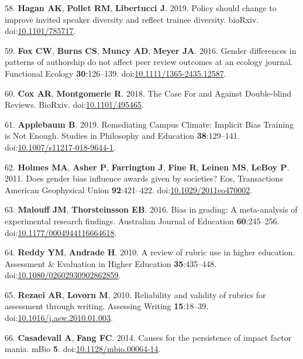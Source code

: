 \documentclass[11pt,]{article}
\begin{document}
\hypertarget{ref-Hagan_2019}{}
58. \textbf{Hagan AK}, \textbf{Pollet RM}, \textbf{Libertucci J}. 2019.
Policy should change to improve invited speaker diversity and reflect
trainee diversity. bioRxiv.
doi:\href{https://doi.org/10.1101/785717}{10.1101/785717}.

\hypertarget{ref-fox_gender_2016}{}
59. \textbf{Fox CW}, \textbf{Burns CS}, \textbf{Muncy AD}, \textbf{Meyer
JA}. 2016. Gender differences in patterns of authorship do not affect
peer review outcomes at an ecology journal. Functional Ecology
\textbf{30}:126--139.
doi:\href{https://doi.org/10.1111/1365-2435.12587}{10.1111/1365-2435.12587}.

\hypertarget{ref-cox_case_2018}{}
60. \textbf{Cox AR}, \textbf{Montgomerie R}. 2018. The Case For and
Against Double-blind Reviews. BioRxiv.
doi:\href{https://doi.org/10.1101/495465}{10.1101/495465}.

\hypertarget{ref-applebaum_remediating_2019}{}
61. \textbf{Applebaum B}. 2019. Remediating Campus Climate: Implicit
Bias Training is Not Enough. Studies in Philosophy and Education
\textbf{38}:129--141.
doi:\href{https://doi.org/10.1007/s11217-018-9644-1}{10.1007/s11217-018-9644-1}.

\hypertarget{ref-Holmes2011}{}
62. \textbf{Holmes MA}, \textbf{Asher P}, \textbf{Farrington J},
\textbf{Fine R}, \textbf{Leinen MS}, \textbf{LeBoy P}. 2011. Does gender
bias influence awards given by societies? Eos, Transactions American
Geophysical Union \textbf{92}:421--422.
doi:\href{https://doi.org/10.1029/2011eo470002}{10.1029/2011eo470002}.

\hypertarget{ref-Malouff2016}{}
63. \textbf{Malouff JM}, \textbf{Thorsteinsson EB}. 2016. Bias in
grading: A meta-analysis of experimental research findings. Australian
Journal of Education \textbf{60}:245--256.
doi:\href{https://doi.org/10.1177/0004944116664618}{10.1177/0004944116664618}.

\hypertarget{ref-Reddy2010}{}
64. \textbf{Reddy YM}, \textbf{Andrade H}. 2010. A review of rubric use
in higher education. Assessment \& Evaluation in Higher Education
\textbf{35}:435--448.
doi:\href{https://doi.org/10.1080/02602930902862859}{10.1080/02602930902862859}.

\hypertarget{ref-Rezaei2010}{}
65. \textbf{Rezaei AR}, \textbf{Lovorn M}. 2010. Reliability and
validity of rubrics for assessment through writing. Assessing Writing
\textbf{15}:18--39.
doi:\href{https://doi.org/10.1016/j.asw.2010.01.003}{10.1016/j.asw.2010.01.003}.

\hypertarget{ref-Casadevall2014}{}
66. \textbf{Casadevall A}, \textbf{Fang FC}. 2014. Causes for the
persistence of impact factor mania. mBio \textbf{5}.
doi:\href{https://doi.org/10.1128/mbio.00064-14}{10.1128/mbio.00064-14}.
\end{document}
